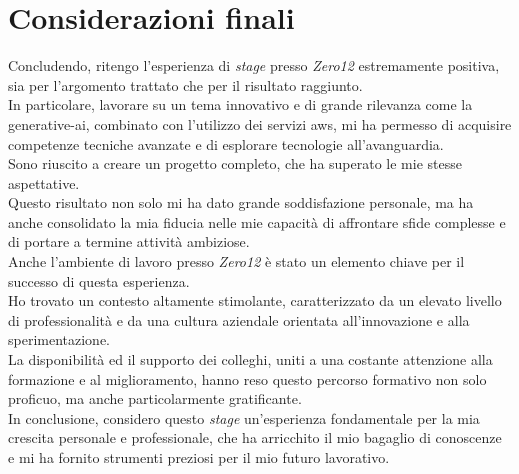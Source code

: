 \pagebreak
\section{Considerazioni finali}
\label{sec:considetazioni-finali}

Concludendo, ritengo l’esperienza di \textit{stage} presso \textit{Zero12} estremamente positiva, sia per l’argomento trattato che per il risultato raggiunto.\\
In particolare, lavorare su un tema innovativo e di grande rilevanza come la \gls{generative-ai}, combinato con l’utilizzo dei servizi \gls{aws}, mi ha permesso di acquisire competenze tecniche avanzate e di esplorare tecnologie all’avanguardia. \\ 

\noindent Sono riuscito a creare un progetto completo, che ha superato le mie stesse aspettative.\\
Questo risultato non solo mi ha dato grande soddisfazione personale, ma ha anche consolidato la mia fiducia nelle mie capacità di affrontare sfide complesse e di portare a termine attività ambiziose.\\  

\noindent Anche l’ambiente di lavoro presso \textit{Zero12} è stato un elemento chiave per il successo di questa esperienza.\\
Ho trovato un contesto altamente stimolante, caratterizzato da un elevato livello di professionalità e da una cultura aziendale orientata all’innovazione e alla sperimentazione.\\
La disponibilità ed il supporto dei colleghi, uniti a una costante attenzione alla formazione e al miglioramento, hanno reso questo percorso formativo non solo proficuo, ma anche particolarmente gratificante. \\

\noindent In conclusione, considero questo \textit{stage} un’esperienza fondamentale per la mia crescita personale e professionale, che ha arricchito il mio bagaglio di conoscenze e mi ha fornito strumenti preziosi per il mio futuro lavorativo.
